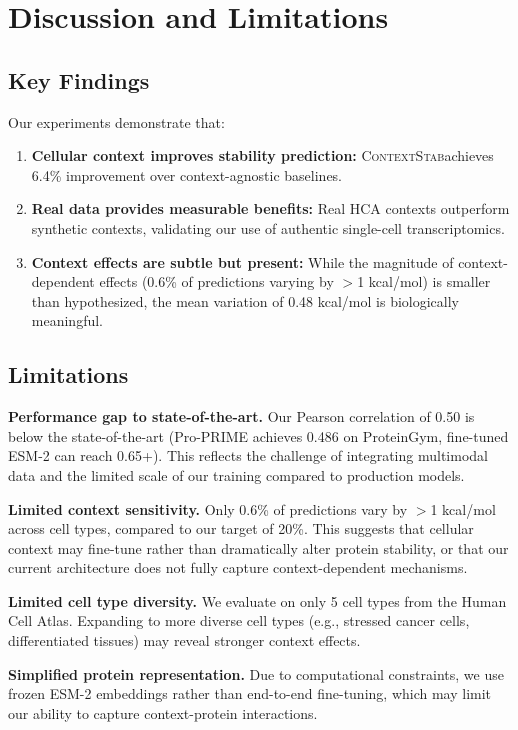 \documentclass{article}
\newcommand{\contextstab}{\textsc{ContextStab}}
\begin{document}
\section{Discussion and Limitations}
\label{sec:discussion}

\subsection{Key Findings}

Our experiments demonstrate that:
\begin{enumerate}
    \item \textbf{Cellular context improves stability prediction:} \contextstab achieves 6.4\% improvement over context-agnostic baselines.
    \item \textbf{Real data provides measurable benefits:} Real HCA contexts outperform synthetic contexts, validating our use of authentic single-cell transcriptomics.
    \item \textbf{Context effects are subtle but present:} While the magnitude of context-dependent effects (0.6\% of predictions varying by $>$1 kcal/mol) is smaller than hypothesized, the mean variation of 0.48 kcal/mol is biologically meaningful.
\end{enumerate}

\subsection{Limitations}

\textbf{Performance gap to state-of-the-art.} Our Pearson correlation of 0.50 is below the state-of-the-art (Pro-PRIME achieves 0.486 on ProteinGym, fine-tuned ESM-2 can reach 0.65+). This reflects the challenge of integrating multimodal data and the limited scale of our training compared to production models.

\textbf{Limited context sensitivity.} Only 0.6\% of predictions vary by $>$1 kcal/mol across cell types, compared to our target of 20\%. This suggests that cellular context may fine-tune rather than dramatically alter protein stability, or that our current architecture does not fully capture context-dependent mechanisms.

\textbf{Limited cell type diversity.} We evaluate on only 5 cell types from the Human Cell Atlas. Expanding to more diverse cell types (e.g., stressed cancer cells, differentiated tissues) may reveal stronger context effects.

\textbf{Simplified protein representation.} Due to computational constraints, we use frozen ESM-2 embeddings rather than end-to-end fine-tuning, which may limit our ability to capture context-protein interactions.
\end{document}
